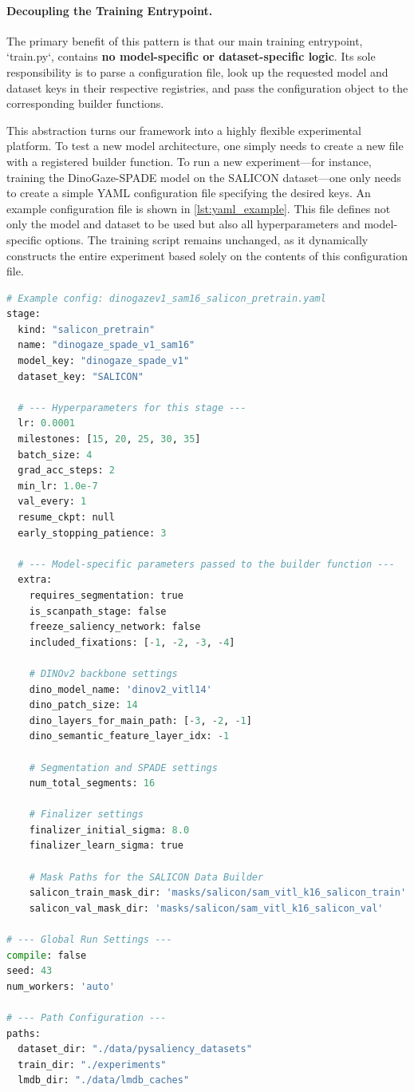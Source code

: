 \paragraph{Decoupling the Training Entrypoint.} The primary benefit of this pattern is that our main training entrypoint, `train.py`, contains \textbf{no model-specific or dataset-specific logic}. Its sole responsibility is to parse a configuration file, look up the requested model and dataset keys in their respective registries, and pass the configuration object to the corresponding builder functions.

This abstraction turns our framework into a highly flexible experimental platform. To test a new model architecture, one simply needs to create a new file with a registered builder function. To run a new experiment---for instance, training the DinoGaze-SPADE model on the SALICON dataset---one only needs to create a simple YAML configuration file specifying the desired keys. An example configuration file is shown in \cref{lst:yaml_example}. This file defines not only the model and dataset to be used but also all hyperparameters and model-specific options. The training script remains unchanged, as it dynamically constructs the entire experiment based solely on the contents of this configuration file.

\begin{lstlisting}[language=Python,
caption={Example of a YAML configuration file that leverages the registry pattern to define an experiment without modifying the core training code.},
label={lst:yaml_example}, float=tp]
# Example config: dinogazev1_sam16_salicon_pretrain.yaml
stage:
  kind: "salicon_pretrain"
  name: "dinogaze_spade_v1_sam16"
  model_key: "dinogaze_spade_v1"
  dataset_key: "SALICON"

  # --- Hyperparameters for this stage ---
  lr: 0.0001
  milestones: [15, 20, 25, 30, 35]
  batch_size: 4
  grad_acc_steps: 2
  min_lr: 1.0e-7
  val_every: 1
  resume_ckpt: null
  early_stopping_patience: 3
  
  # --- Model-specific parameters passed to the builder function ---
  extra:
    requires_segmentation: true
    is_scanpath_stage: false
    freeze_saliency_network: false
    included_fixations: [-1, -2, -3, -4]
    
    # DINOv2 backbone settings
    dino_model_name: 'dinov2_vitl14'
    dino_patch_size: 14
    dino_layers_for_main_path: [-3, -2, -1]
    dino_semantic_feature_layer_idx: -1
    
    # Segmentation and SPADE settings
    num_total_segments: 16
    
    # Finalizer settings
    finalizer_initial_sigma: 8.0
    finalizer_learn_sigma: true

    # Mask Paths for the SALICON Data Builder
    salicon_train_mask_dir: 'masks/salicon/sam_vitl_k16_salicon_train'
    salicon_val_mask_dir: 'masks/salicon/sam_vitl_k16_salicon_val'

# --- Global Run Settings ---
compile: false
seed: 43
num_workers: 'auto'

# --- Path Configuration ---
paths:
  dataset_dir: "./data/pysaliency_datasets"
  train_dir: "./experiments"
  lmdb_dir: "./data/lmdb_caches"
\end{lstlisting}

